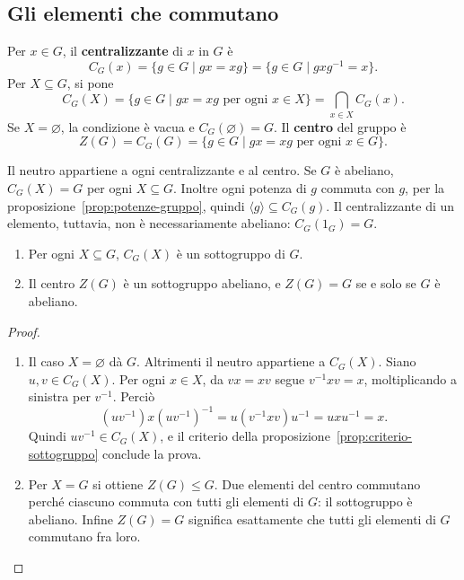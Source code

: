 \subsection{Gli elementi che commutano}
\begin{definizione}
Per $x\in G$, il \textbf{centralizzante} di $x$ in $G$ è
\[
C_G(x)=\{g\in G\mid gx=xg\}=\{g\in G\mid gxg^{-1}=x\}.
\]
Per $X\subseteq G$, si pone
\[
C_G(X)=\{g\in G\mid gx=xg\text{ per ogni }x\in X\}
      =\bigcap_{x\in X}C_G(x).
\]
Se $X=\varnothing$, la condizione è vacua e $C_G(\varnothing)=G$. Il \textbf{centro} del gruppo è
\[
Z(G)=C_G(G)=\{g\in G\mid gx=xg\text{ per ogni }x\in G\}.
\]
\end{definizione}

\begin{osservazione}
Il neutro appartiene a ogni centralizzante e al centro. Se $G$ è abeliano, $C_G(X)=G$ per ogni $X\subseteq G$. Inoltre ogni potenza di $g$ commuta con $g$, per la proposizione~\ref{prop:potenze-gruppo}, quindi $\langle g\rangle\subseteq C_G(g)$. Il centralizzante di un elemento, tuttavia, non è necessariamente abeliano: $C_G(1_G)=G$.
\end{osservazione}

\begin{proposizione}\label{prop:centralizzante-sottogruppo}
\begin{enumerate}[label=\arabic*.]
\item Per ogni $X\subseteq G$, $C_G(X)$ è un sottogruppo di $G$.
\item Il centro $Z(G)$ è un sottogruppo abeliano, e $Z(G)=G$ se e solo se $G$ è abeliano.
\end{enumerate}
\end{proposizione}
\begin{proof}
\begin{enumerate}[label=\arabic*.]
\item Il caso $X=\varnothing$ dà $G$. Altrimenti il neutro appartiene a $C_G(X)$. Siano $u,v\in C_G(X)$. Per ogni $x\in X$, da $vx=xv$ segue $v^{-1}xv=x$, moltiplicando a sinistra per $v^{-1}$. Perciò
\[
(uv^{-1})x(uv^{-1})^{-1}
 =u(v^{-1}xv)u^{-1}=uxu^{-1}=x.
\]
Quindi $uv^{-1}\in C_G(X)$, e il criterio della proposizione~\ref{prop:criterio-sottogruppo} conclude la prova.
\item Per $X=G$ si ottiene $Z(G)\le G$. Due elementi del centro commutano perché ciascuno commuta con tutti gli elementi di $G$: il sottogruppo è abeliano. Infine $Z(G)=G$ significa esattamente che tutti gli elementi di $G$ commutano fra loro.
\end{enumerate}
\end{proof}

